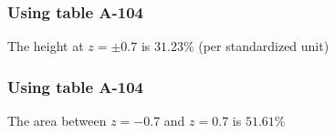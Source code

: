 \documentclass[handout]{beamer}
\begin{document}
   \begin{frame}
   \frametitle{Using table A-104}
   \begin{center}
   \end{center}
   The height at  $z= \pm 0.7$ is $31.23\%$ (per standardized unit)
   \end{frame}



   \begin{frame}
   \frametitle{Using table A-104}
   \begin{center}
   \end{center}
   The area between $z=-0.7$ and $z=0.7$ is $51.61\%$
   \end{frame}

\end{document}
